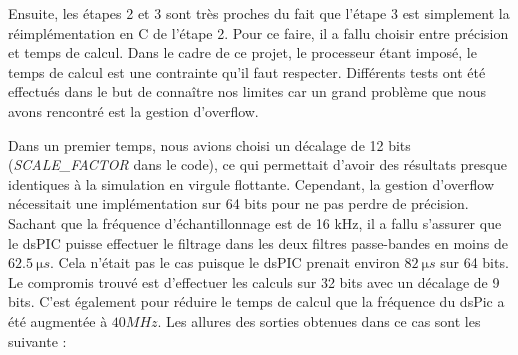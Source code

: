 Ensuite, les étapes 2 et 3 sont très proches du fait que l'étape 3 est simplement la réimplémentation en C de l'étape 2. Pour ce faire, il a fallu choisir entre précision et temps de calcul. Dans le cadre de ce projet, le processeur étant imposé, le temps de calcul est une contrainte qu'il faut respecter. Différents tests ont été effectués dans le but de connaître nos limites car un grand problème que nous avons rencontré est la gestion d'overflow.

Dans un premier temps, nous avions choisi un décalage de 12 bits (\textit{SCALE\_FACTOR} dans le code), ce qui permettait d'avoir des résultats presque identiques à la simulation en virgule flottante. Cependant, la gestion d'overflow nécessitait une implémentation sur 64 bits pour ne pas perdre de précision. Sachant que la fréquence d'échantillonnage est de 16 kHz, il a fallu s'assurer que le dsPIC puisse effectuer le filtrage dans les deux filtres passe-bandes en moins de $\SI{62,5}{\micro s}$. Cela n'était pas le cas puisque le dsPIC prenait environ $\SI{82}{\micro s}$ sur 64 bits. Le compromis trouvé est d'effectuer les calculs sur 32 bits avec un décalage de 9 bits. C'est également pour réduire le temps de calcul que la fréquence du dsPic a été augmentée à $40MHz$. Les allures des sorties obtenues dans ce cas sont les suivante :

